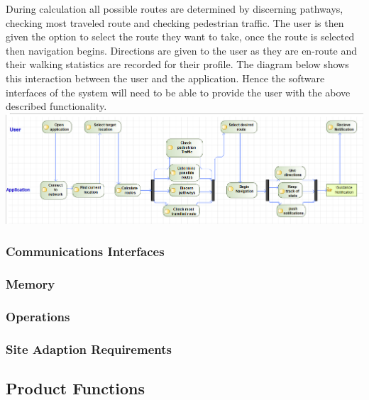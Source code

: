 \documentclass[a4paper,12pt]{article}
\begin{document}
During calculation all possible routes are determined by discerning pathways, checking most traveled route and checking pedestrian traffic. The user is then given the option to select the route they want to take, once the route is selected then navigation begins. Directions are given to the user as they are en-route and their walking statistics are recorded for their profile. The diagram below shows this interaction between the user and the application. Hence the software interfaces of the system will need to be able to provide the user with the above described functionality.\\
\includegraphics[width=\textwidth]{images/software_interface.png}\\
\subsubsection{Communications Interfaces}
\subsubsection{Memory}
\subsubsection{Operations}
\subsubsection{Site Adaption Requirements}
\newpage
\subsection{Product Functions}
\end{document}
